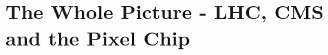 \documentclass[british,11pt,a4paper]{memoir}
\begin{document}
\chapter{The Whole Picture - LHC, CMS and the Pixel Chip}
\tableofcontents
\end{document}
